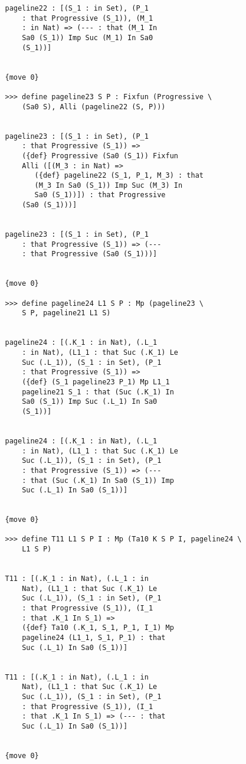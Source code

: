 \documentclass{article}
\begin{document}
\begin{verbatim}
   pageline22 : [(S_1 : in Set), (P_1 
       : that Progressive (S_1)), (M_1 
       : in Nat) => (--- : that (M_1 In 
       Sa0 (S_1)) Imp Suc (M_1) In Sa0 
       (S_1))]


   {move 0}

   >>> define pageline23 S P : Fixfun (Progressive \
       (Sa0 S), Alli (pageline22 (S, P)))


   pageline23 : [(S_1 : in Set), (P_1 
       : that Progressive (S_1)) => 
       ({def} Progressive (Sa0 (S_1)) Fixfun 
       Alli ([(M_3 : in Nat) => 
          ({def} pageline22 (S_1, P_1, M_3) : that 
          (M_3 In Sa0 (S_1)) Imp Suc (M_3) In 
          Sa0 (S_1))]) : that Progressive 
       (Sa0 (S_1)))]


   pageline23 : [(S_1 : in Set), (P_1 
       : that Progressive (S_1)) => (--- 
       : that Progressive (Sa0 (S_1)))]


   {move 0}

   >>> define pageline24 L1 S P : Mp (pageline23 \
       S P, pageline21 L1 S)


   pageline24 : [(.K_1 : in Nat), (.L_1 
       : in Nat), (L1_1 : that Suc (.K_1) Le 
       Suc (.L_1)), (S_1 : in Set), (P_1 
       : that Progressive (S_1)) => 
       ({def} (S_1 pageline23 P_1) Mp L1_1 
       pageline21 S_1 : that (Suc (.K_1) In 
       Sa0 (S_1)) Imp Suc (.L_1) In Sa0 
       (S_1))]


   pageline24 : [(.K_1 : in Nat), (.L_1 
       : in Nat), (L1_1 : that Suc (.K_1) Le 
       Suc (.L_1)), (S_1 : in Set), (P_1 
       : that Progressive (S_1)) => (--- 
       : that (Suc (.K_1) In Sa0 (S_1)) Imp 
       Suc (.L_1) In Sa0 (S_1))]


   {move 0}

   >>> define T11 L1 S P I : Mp (Ta10 K S P I, pageline24 \
       L1 S P)


   T11 : [(.K_1 : in Nat), (.L_1 : in 
       Nat), (L1_1 : that Suc (.K_1) Le 
       Suc (.L_1)), (S_1 : in Set), (P_1 
       : that Progressive (S_1)), (I_1 
       : that .K_1 In S_1) => 
       ({def} Ta10 (.K_1, S_1, P_1, I_1) Mp 
       pageline24 (L1_1, S_1, P_1) : that 
       Suc (.L_1) In Sa0 (S_1))]


   T11 : [(.K_1 : in Nat), (.L_1 : in 
       Nat), (L1_1 : that Suc (.K_1) Le 
       Suc (.L_1)), (S_1 : in Set), (P_1 
       : that Progressive (S_1)), (I_1 
       : that .K_1 In S_1) => (--- : that 
       Suc (.L_1) In Sa0 (S_1))]


   {move 0}


\end{verbatim}
\end{document}
